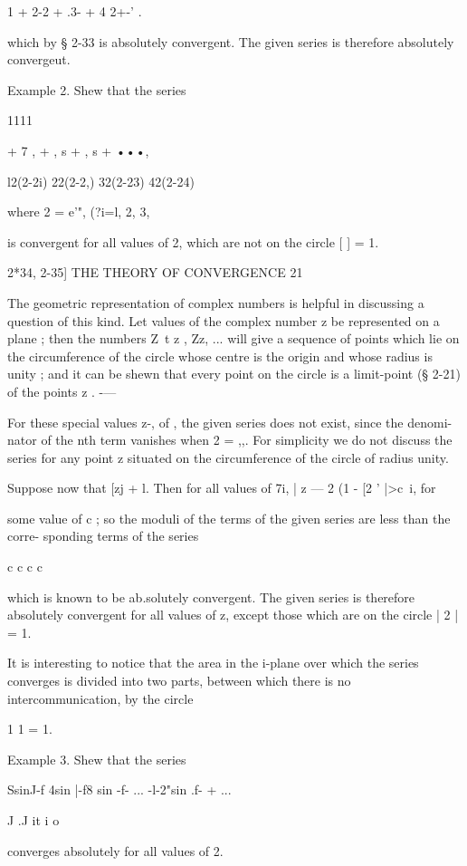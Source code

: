 1 + 2-2 + .3- + 4 2+-' .

which by § 2-33 is absolutely convergent. The given series is
therefore absolutely convergeut.

Example 2. Shew that the series

1111

+ 7 , + , s + , s + •••,



l2(2-2i) 22(2-2,) 32(2-23) 42(2-24)

where 2 = e'", (?i=l, 2, 3,

is convergent for all values of 2, which are not on the circle [ ] =
1.



2*34, 2-35] THE THEORY OF CONVERGENCE 21

The geometric representation of complex numbers is helpful in
discussing a question of this kind. Let values of the complex number z
be represented on a plane ; then the numbers Z\ t z , Zz, ... will
give a sequence of points which lie on the circumference of the circle
whose centre is the origin and whose radius is unity ; and it can be
shewn that every point on the circle is a limit-point (§ 2-21) of the
points z . -—

For these special values z-, of , the given series does not exist,
since the denomi- nator of the nth term vanishes when 2 = ,,. For
simplicity we do not discuss the series for any point z situated on
the circumference of the circle of radius unity.

Suppose now that [zj + l. Then for all values of 7i, | z — 2 (1 - [2 '
|>c~i, for

some value of c ; so the moduli of the terms of the given series are
less than the corre- sponding terms of the series

c c c c

which is known to be ab.solutely convergent. The given series is
therefore absolutely convergent for all values of z, except those
which are on the circle | 2 | = 1.

It is interesting to notice that the area in the i-plane over which
the series converges is divided into two parts, between which there is
no intercommunication, by the circle

1 1 = 1.

Example 3. Shew that the series

SsinJ-f 4sin |-f8 sin -f- ... -l-2"sin .f- + ...

 J .J it i o

converges absolutely for all values of 2.

